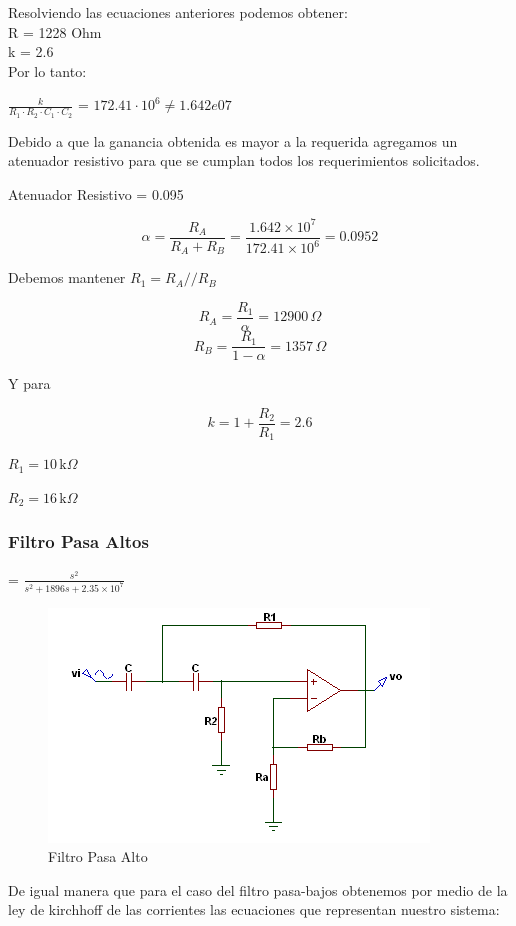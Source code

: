 \hspace{1mm}Resolviendo las ecuaciones anteriores podemos obtener:\\
R = 1228 Ohm \\
k = 2.6 \\
\hspace{1mm} Por lo tanto: \\
\begin{center}
 $\frac{k}{R_1 \cdot R_2 \cdot C_1 \cdot C_2}$ = $172.41 \cdot 10^6 \neq 1.642e07$ \\
\end{center}

\hspace{1mm} Debido a que la ganancia obtenida es mayor a la requerida agregamos un atenuador resistivo para que se cumplan todos los requerimientos solicitados.\\
\begin{center}
 Atenuador Resistivo  = 0.095
\end{center}

\[
\alpha = \frac{R_A}{R_A + R_B} = \frac{1.642 \times 10^7}{172.41 \times 10^6} = 0.0952
\]

\hspace{1mm} Debemos mantener \( R_1 = R_A//R_B \)

\[
R_A = \frac{R_1}{\alpha} = 12900 \, \Omega
\]
\[
R_B = \frac{R_1}{1-\alpha} = 1357 \, \Omega
\]

\hspace{1mm} Y para

\[
k = 1 + \frac{R_2}{R_1} = 2.6
\]

\hspace{1mm} \(R_1 = 10 \, \text{k} \Omega \)

\(   R_2 = 16 \, \text{k} \Omega \)

\subsubsection{Filtro Pasa Altos} 

 = \(\frac{s^2}{s^2 + 1896s + 2.35 \times 10^7}\) \\

\begin{figure}[H]
    \centering
    \includegraphics[width=0.75\linewidth]{figuras/filtropasaaltosgen.PNG}
    \caption{Filtro Pasa Alto}
\end{figure}
\hspace{1mm} De igual manera que para el caso del filtro pasa-bajos obtenemos por medio de la ley de kirchhoff de las corrientes las ecuaciones que representan nuestro sistema:

